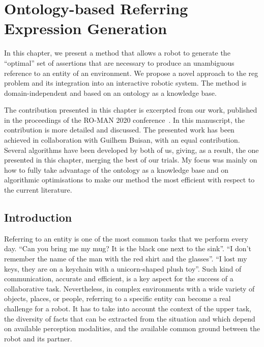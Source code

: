 \ifdefined{}
\else
\setcounter{chapter}{4} %
\dominitoc
\faketableofcontents
\fi

\chapter{Ontology-based Referring Expression Generation}
\label{chap:4}
\minitoc

In this chapter, we present a method that allows a robot to generate the ``optimal'' set of assertions that are necessary to produce an unambiguous reference to an entity of an environment. We propose a novel approach to the \acrfull{reg} problem and its integration into an interactive robotic system. The method is domain-independent and based on an ontology as a knowledge base.

The contribution presented in this chapter is excerpted from our work, published in the proceedings of the RO-MAN 2020 conference~\cite{buisan_2020_efficient}. In this manuscript, the contribution is more detailed and discussed. The presented work has been achieved in collaboration with Guilhem Buisan, with an equal contribution. Several algorithms have been developed by both of us, giving, as a result, the one presented in this chapter, merging the best of our trials. My focus was mainly on how to fully take advantage of the ontology as a knowledge base and on algorithmic optimisations to make our method the most efficient with respect to the current literature.

\section{Introduction}

Referring to an entity is one of the most common tasks that we perform every day. ``Can you bring me my mug? It is the black one next to the sink''. ``I don't remember the name of the man with the red shirt and the glasses''. ``I lost my keys, they are on a keychain with a unicorn-shaped plush toy''. Such kind of communication, accurate and efficient, is a key aspect for the success of a collaborative task. Nevertheless, in complex environments with a wide variety of objects, places, or people, referring to a specific entity can become a real challenge for a robot. It has to take into account the context of the upper task, the diversity of facts that can be extracted from the situation and which depend on available perception modalities, and the available common ground between the robot and its partner. 

